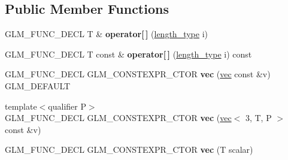 \subsection*{Public Member Functions}
\begin{DoxyCompactItemize}
\item 
\mbox{\label{structglm_1_1vec_3_013_00_01T_00_01Q_01_4_a7f555e7e0581a8e53ac675fde684055b}} 
G\+L\+M\+\_\+\+F\+U\+N\+C\+\_\+\+D\+E\+CL T \& {\bfseries operator\mbox{[}$\,$\mbox{]}} (\hyperlink{structglm_1_1vec_3_013_00_01T_00_01Q_01_4_ab586a87f82719bfdd180336a98843257}{length\+\_\+type} i)
\item 
\mbox{\label{structglm_1_1vec_3_013_00_01T_00_01Q_01_4_a361188d270506795b9a46c2fc2857e69}} 
G\+L\+M\+\_\+\+F\+U\+N\+C\+\_\+\+D\+E\+CL T const  \& {\bfseries operator\mbox{[}$\,$\mbox{]}} (\hyperlink{structglm_1_1vec_3_013_00_01T_00_01Q_01_4_ab586a87f82719bfdd180336a98843257}{length\+\_\+type} i) const
\item 
\mbox{\label{structglm_1_1vec_3_013_00_01T_00_01Q_01_4_ae7088be55070909fe11da6bead3679f9}} 
G\+L\+M\+\_\+\+F\+U\+N\+C\+\_\+\+D\+E\+CL G\+L\+M\+\_\+\+C\+O\+N\+S\+T\+E\+X\+P\+R\+\_\+\+C\+T\+OR {\bfseries vec} (\hyperlink{structglm_1_1vec}{vec} const \&v) G\+L\+M\+\_\+\+D\+E\+F\+A\+U\+LT
\item 
\mbox{\label{structglm_1_1vec_3_013_00_01T_00_01Q_01_4_a1b43d4595236da757e4054e1a4717153}} 
{\footnotesize template$<$qualifier P$>$ }\\G\+L\+M\+\_\+\+F\+U\+N\+C\+\_\+\+D\+E\+CL G\+L\+M\+\_\+\+C\+O\+N\+S\+T\+E\+X\+P\+R\+\_\+\+C\+T\+OR {\bfseries vec} (\hyperlink{structglm_1_1vec}{vec}$<$ 3, T, P $>$ const \&v)
\item 
\mbox{\label{structglm_1_1vec_3_013_00_01T_00_01Q_01_4_a3969041c27af93819cfcc2ca0a410277}} 
G\+L\+M\+\_\+\+F\+U\+N\+C\+\_\+\+D\+E\+CL G\+L\+M\+\_\+\+C\+O\+N\+S\+T\+E\+X\+P\+R\+\_\+\+C\+T\+OR {\bfseries vec} (T scalar)
\item 
\mbox{\label{structglm_1_1vec_3_013_00_01T_00_01Q_01_4_ac155207ddc7d4472ce12d1f874cb0bcc}} 

\end{DoxyCompactItemize}
